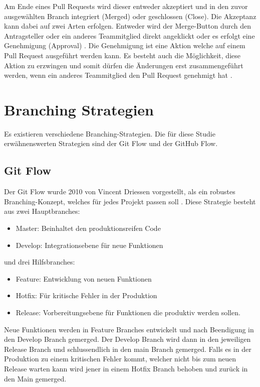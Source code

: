 Am Ende eines Pull Requests wird dieser entweder akzeptiert und in den zuvor ausgewählten Branch integriert (Merged) oder geschlossen (Close)\parencite{noauthor_merging_nodate}\parencite{noauthor_closing_nodate}. Die Akzeptanz kann dabei auf zwei Arten erfolgen. Entweder wird der Merge-Button durch den Antragsteller oder ein anderes Teammitglied direkt angeklickt oder es erfolgt eine Genehmigung (Approval) \parencite{noauthor_merging_nodate}\parencite{noauthor_reviewing_nodate}. Die Genehmigung ist eine Aktion welche auf einem Pull Request ausgeführt werden kann. Es besteht auch die Möglichkeit, diese Aktion zu erzwingen und somit dürfen die Änderungen erst zusammengeführt werden, wenn ein anderes Teammitglied den Pull Request genehmigt hat \parencite{noauthor_approving_nodate}.

\section{Branching Strategien}
Es existieren verschiedene Branching-Strategien. Die für diese Studie erwähnenswerten Strategien sind der Git Flow und der GitHub Flow. \parencite{priyanka_gowdaashwath_narayana_gowda_git-branching-and-release-strategies_2022} 
\subsection{Git Flow}
\label{sec:GitFlow}
Der Git Flow wurde 2010 von Vincent Driessen vorgestellt, als ein robustes Branching-Konzept, welches für jedes Projekt passen soll \parencite{priyanka_gowdaashwath_narayana_gowda_git-branching-and-release-strategies_2022}.
Diese Strategie besteht aus zwei Hauptbranches:
\begin{itemize}
    \item Master: Beinhaltet den produktionsreifen Code  
    \item Develop: Integrationsebene für neue Funktionen
\end{itemize}
und drei Hilfsbranches:
\begin{itemize}
    \item Feature: Entwicklung von neuen Funktionen
    \item Hotfix: Für kritische Fehler in der Produktion
    \item Release: Vorbereitungsebene für Funktionen die produktiv werden sollen.
\end{itemize}
Neue Funktionen werden in Feature Branches entwickelt und nach Beendigung in den Develop Branch gemerged. Der Develop Branch wird dann in den jeweiligen Release Branch und schlussendlich in den main Branch gemerged. Falls es in der Produktion zu einem kritischen Fehler kommt, welcher nicht bis zum neuen Release warten kann wird jener in einem Hotfix Branch behoben und zurück in den Main gemerged.
\parencite{priyanka_gowdaashwath_narayana_gowda_git-branching-and-release-strategies_2022}

